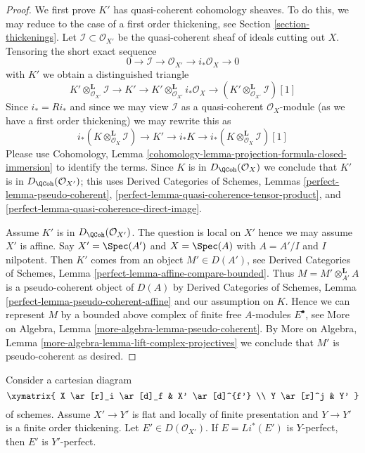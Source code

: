 \begin{proof}
We first prove $K'$ has quasi-coherent cohomology sheaves.
To do this, we may reduce to the case of a first order thickening, see
Section \ref{section-thickenings}. Let $\mathcal{I} \subset \mathcal{O}_{X'}$
be the quasi-coherent sheaf of ideals cutting out $X$.
Tensoring the short exact sequence
$$
0 \to \mathcal{I} \to \mathcal{O}_{X'} \to i_*\mathcal{O}_X \to 0
$$
with $K'$ we obtain a distinguished triangle
$$
K' \otimes_{\mathcal{O}_{X'}}^\mathbf{L} \mathcal{I}
\to K' \to
K' \otimes_{\mathcal{O}_{X'}}^\mathbf{L} i_*\mathcal{O}_X
\to
(K' \otimes_{\mathcal{O}_{X'}}^\mathbf{L} \mathcal{I})[1]
$$
Since $i_* = Ri_*$ and since we may view $\mathcal{I}$
as a quasi-coherent $\mathcal{O}_X$-module (as we have a first
order thickening) we may rewrite this as
$$
i_*(K \otimes_{\mathcal{O}_X}^\mathbf{L} \mathcal{I})
\to K' \to
i_*K \to
i_*(K \otimes_{\mathcal{O}_X}^\mathbf{L} \mathcal{I})[1]
$$
Please use Cohomology, Lemma
\ref{cohomology-lemma-projection-formula-closed-immersion}
to identify the terms. Since $K$ is in
$D_\QCoh(\mathcal{O}_X)$ we conclude that
$K'$ is in $D_\QCoh(\mathcal{O}_{X'})$; this uses
Derived Categories of Schemes, Lemmas
\ref{perfect-lemma-pseudo-coherent},
\ref{perfect-lemma-quasi-coherence-tensor-product}, and
\ref{perfect-lemma-quasi-coherence-direct-image}.

\medskip\noindent
Assume $K'$ is in $D_\QCoh(\mathcal{O}_{X'})$.
The question is local on $X'$ hence we may assume $X'$ is affine.
Say $X' = \Spec(A')$ and $X = \Spec(A)$ with $A = A'/I$ and $I$ nilpotent.
Then $K'$ comes from an object $M' \in D(A')$, see
Derived Categories of Schemes, Lemma
\ref{perfect-lemma-affine-compare-bounded}.
Thus $M = M' \otimes_{A'}^\mathbf{L} A$ is a pseudo-coherent
object of $D(A)$ by Derived Categories of Schemes,
Lemma \ref{perfect-lemma-pseudo-coherent-affine} and our assumption on $K$.
Hence we can represent $M$
by a bounded above complex of finite free $A$-modules $E^\bullet$, see
More on Algebra, Lemma \ref{more-algebra-lemma-pseudo-coherent}.
By More on Algebra, Lemma
\ref{more-algebra-lemma-lift-complex-projectives}
we conclude that $M'$ is pseudo-coherent as desired.
\end{proof}

\begin{lemma}
\label{lemma-thickening-relatively-perfect}
Consider a cartesian diagram
$$
\xymatrix{
X \ar[r]_i \ar[d]_f & X' \ar[d]^{f'} \\
Y \ar[r]^j & Y'
}
$$
of schemes. Assume $X' \to Y'$ is flat and locally
of finite presentation and $Y \to Y'$ is a finite order thickening.
Let $E' \in D(\mathcal{O}_{X'})$. If $E = Li^*(E')$ is $Y$-perfect,
then $E'$ is $Y'$-perfect.
\end{lemma}


